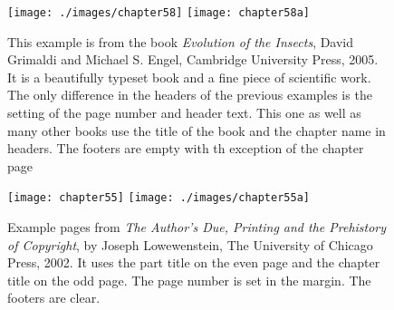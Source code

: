 \begin{figure}
\centering
\texttt{[image: ./images/chapter58]}\vspace{0.5\baselineskip}
\texttt{[image: chapter58a]}
\caption{This example is from the book \textit{Evolution of the Insects}, David Grimaldi and Michael S. Engel,  Cambridge University Press, 2005. It is a beautifully typeset book and a fine piece of scientific work. The only difference in the headers of the previous examples is the setting of the page number and header text. This one as well as many other books use the title of the book and the chapter name in headers. The footers are empty with th exception of the chapter page}
\end{figure}


\begin{figure}
\centering
\texttt{[image: chapter55]}\vspace{0.5\baselineskip}
\texttt{[image: ./images/chapter55a]}
\caption{Example pages from \textit{The Author's Due, Printing and the Prehistory of Copyright}, by Joseph Lowewenstein, The University of Chicago Press, 2002.  It uses the part title on the even page and the chapter title on the odd page. The page number is set in the margin. The footers are clear.}
\end{figure}


